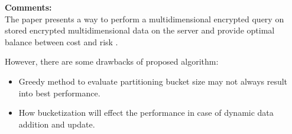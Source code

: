 \documentclass[a4paper,12pt, twoside]{article}
\begin{document}
  
\textbf{Comments:}\\
The paper presents a way to perform a multidimensional encrypted query on stored encrypted multidimensional data on the server and provide optimal balance between cost and risk .

However, there are some drawbacks of proposed algorithm:
\begin{itemize}
	\item Greedy method to evaluate partitioning bucket size may not always result into best performance.
	\item How bucketization will effect the performance in case of dynamic data addition and update.
\end{itemize}
\end{document}
